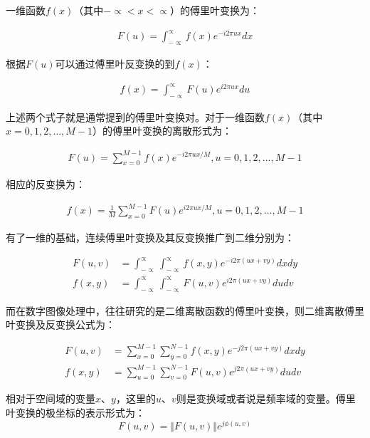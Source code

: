 一维函数$f(x)$（其中$-\propto<x<\propto$）的傅里叶变换为：
\begin{linenomath}
\begin{align}
F(u)=\int^{\propto}_{-\propto}f(x)e^{-i2\pi ux}dx
\label{式2_14}
\end{align}
\end{linenomath}
根据$F(u)$可以通过傅里叶反变换的到$f(x)$：
\begin{linenomath}
\begin{align}
f(x)=\int^{\propto}_{-\propto}F(u)e^{i2\pi ux}du
\label{式2_15}
\end{align}
\end{linenomath}
上述两个式子就是通常提到的傅里叶变换对。对于一维函数$f(x)$（其中$x=0,1,2,\dots,M-1$）的傅里叶变换的离散形式为：
\begin{linenomath}
\begin{align}
F(u)=\sum^{M-1}_{x=0}f(x)e^{-i2\pi ux/M}, u=0,1,2,\dots,M-1
\label{式2_16}
\end{align}
\end{linenomath}
相应的反变换为：
\begin{linenomath}
\begin{align}
f(x)=\frac{1}{M}\sum^{M-1}_{x=0}F(u)e^{i2\pi ux/M},u=0,1,2,\dots,M-1
\label{式2_17}
\end{align}
\end{linenomath}
有了一维的基础，连续傅里叶变换及其反变换推广到二维分别为：
\begin{linenomath}
\begin{align}
F(u,v) &= \int^{\propto}_{-\propto}\int^{\propto}_{-\propto}f(x,y)e^{-i2\pi (ux+vy)}dxdy\label{式2_18}\\
f(x,y) &= \int^{\propto}_{-\propto}\int^{\propto}_{-\propto}F(u,v)e^{i2\pi (ux+vy)}dudv\label{式2_19}
\end{align}
\end{linenomath}
而在数字图像处理中，往往研究的是二维离散函数的傅里叶变换，则二维离散傅里叶变换及反变换公式为：
\begin{linenomath}
\begin{align}
F(u,v) &= \sum^{M-1}_{x=0}\sum^{N-1}_{y=0}f(x,y)e^{-j2\pi (ux+vy)}dxdy\label{式2_20}\\
f(x,y) &= \sum^{M-1}_{u=0}\sum^{N-1}_{v=0}F(u,v)e^{j2\pi (ux+vy)}dudv\label{式2_21}
\end{align}
\end{linenomath}
相对于空间域的变量$x$、$y$，这里的$u$、$v$则是变换域或者说是频率域的变量。傅里叶变换的极坐标的表示形式为：
\begin{equation}
F(u,v)=\Vert F(u,v)\Vert e^{j\phi(u,v)}
\label{式2_22}
\end{equation}
